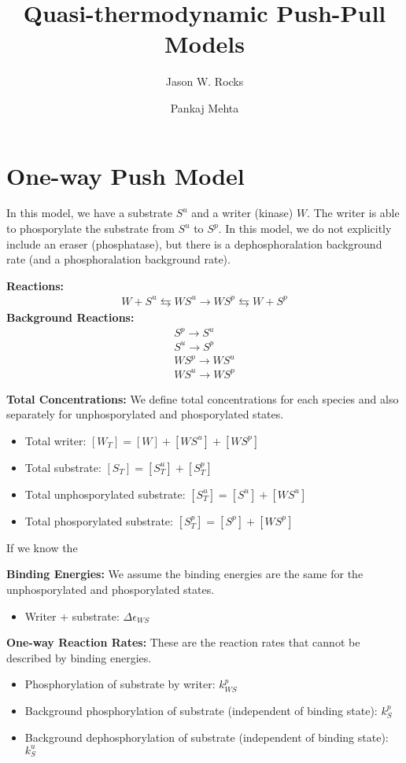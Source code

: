 \documentclass[aps,onecolumn,superscriptaddress,notitlepage]{revtex4-1}
\begin{document}
\title{Quasi-thermodynamic Push-Pull Models}
\author{Jason W. Rocks}
\author{Pankaj Mehta}
\maketitle


\section{One-way Push Model}


In this model, we have a substrate $S^u$ and a writer (kinase) $W$. 
The writer is able to phosporylate the substrate from $S^u$ to $S^p$.
In this model, we do not explicitly include an eraser (phosphatase), 
but there is a dephosphoralation background rate (and a phosphoralation background rate).

\textbf{Reactions:}
\begin{gather}
W + S^u \leftrightarrows WS^u \rightarrow WS^p \leftrightarrows W + S^p
\end{gather}
\textbf{Background Reactions:}
\begin{gather}
S^p \rightarrow S^u\\
S^u \rightarrow S^p\\
WS^p \rightarrow WS^u\\
WS^u \rightarrow WS^p
\end{gather}


\textbf{Total Concentrations:}
We define total concentrations for each species and also separately for unphosporylated and phosporylated states.
\begin{itemize}
\item Total writer: $[W_T] = [W] + [WS^u] + [WS^p]$
\item Total substrate: $[S_T] = [S^u_T] + [S^p_T]$
\item Total unphosporylated substrate: $[S^u_T] = [S^u] + [WS^u]$
\item Total phosporylated substrate: $[S^p_T] = [S^p] + [WS^p]$
\end{itemize}
If we know the 

\textbf{Binding Energies:}
We assume the binding energies are the same for the unphosporylated and phosporylated states.
\begin{itemize}
\item Writer + substrate: $\Delta\epsilon_{WS}$
\end{itemize}

\textbf{One-way Reaction Rates:}
These are the reaction rates that cannot be described by binding energies.
\begin{itemize}
\item Phosphorylation of substrate by writer: $k_{WS}^p$
\item Background phosphorylation of substrate (independent of binding state): $k_S^p$
\item Background dephosphorylation of substrate (independent of binding state): $k_S^u$
\end{itemize}
\end{document}
